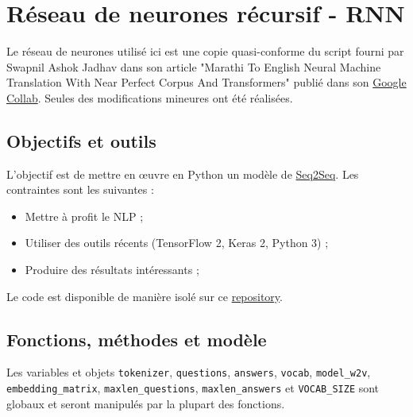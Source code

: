 \documentclass[10pt,a4paper]{article}
\newcommand\tab[1][0.5cm]{\hspace*{#1}}
\begin{document}
\section{Réseau de neurones récursif - RNN}
Le réseau de neurones utilisé ici est une copie quasi-conforme du script fourni par Swapnil Ashok Jadhav dans son article "Marathi To English Neural Machine Translation With Near Perfect Corpus And Transformers" publié dans son \href{https://colab.research.google.com/drive/11os3isH4I4X76dwOAQJ5cSRnfhmUziHm#scrollTo=dHBP5xzmrM4U}{Google Collab}. Seules des modifications mineures ont été réalisées.
\subsection{Objectifs et outils}
L'objectif est de mettre en œuvre en Python un modèle de \href{https://arxiv.org/abs/1409.3215}{Seq2Seq}. Les contraintes sont les suivantes :
\begin{itemize}
\item Mettre à profit le NLP ;
\item Utiliser des outils récents (TensorFlow 2, Keras 2, Python 3) ;
\item Produire des résultats intéressants ;
\end{itemize}
\tab Le code est disponible de manière isolé sur ce \href{https://github.com/LaraProject/seq2seq}{repository}.
\subsection{Fonctions, méthodes et modèle}
Les variables et objets \texttt{tokenizer}, \texttt{questions}, \texttt{answers}, \texttt{vocab}, \texttt{model\_w2v}, \texttt{embedding\_matrix}, \texttt{maxlen\_questions}, \texttt{maxlen\_answers} et \texttt{VOCAB\_SIZE} sont globaux et seront manipulés par la plupart des fonctions.
\end{document}
